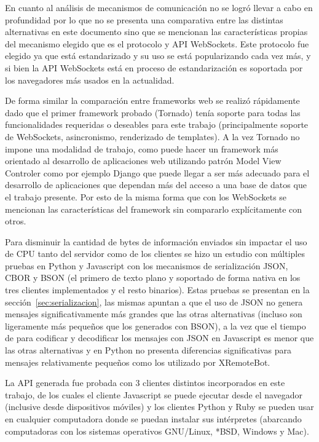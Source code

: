 En cuanto al análisis de mecanismos de comunicación no se logró llevar a cabo
en profundidad por lo que no se presenta una comparativa entre las distintas
alternativas en este documento sino que se mencionan las características propias
del mecanismo elegido que es el protocolo y API WebSockets. Este protocolo fue
elegido ya que está estandarizado y su uso se está popularizando cada vez más,
y si bien la API WebSockets está en proceso de estandarización es soportada
por los navegadores más usados en la actualidad.

De forma similar la comparación entre frameworks web se realizó rápidamente
dado que el primer framework probado (Tornado) tenía soporte para todas
las funcionalidades requeridas o deseables para este trabajo (principalmente
soporte de WebSockets, asincronismo, renderizado de templates).
A la vez Tornado no impone
una modalidad de trabajo, como puede hacer un framework más orientado al
desarrollo de aplicaciones web utilizando patrón Model View Controler
como por ejemplo Django que puede llegar a ser más adecuado para el desarrollo
de aplicaciones que dependan más del acceso a una base de datos que el
trabajo presente. Por esto de la misma forma que con los WebSockets se mencionan
las características del framework sin compararlo explícitamente con otros.

Para disminuir la cantidad de bytes de información enviados sin impactar el
uso de CPU tanto del servidor como de los clientes se hizo un estudio con
múltiples pruebas en Python y Javascript con los mecanismos de serialización
JSON, CBOR y BSON (el primero de texto plano y soportado de forma nativa en los
tres clientes implementados y el resto binarios). Estas pruebas se presentan
en la sección~\ref{sec:serializacion}, las mismas apuntan a que el uso de JSON
no genera mensajes significativamente más grandes que las otras alternativas
(incluso son ligeramente más pequeños que los generados con BSON), a la vez
que el tiempo de para codificar y decodificar los mensajes con JSON en
Javascript es menor que las otras alternativas y en Python no presenta
diferencias significativas para mensajes relativamente pequeños como los utilizado
por XRemoteBot.

La API generada fue probada con 3 clientes distintos incorporados en este
trabajo, de los cuales el cliente Javascript se puede ejecutar desde el
navegador (inclusive desde dispositivos móviles) y los clientes Python y
Ruby se pueden usar en cualquier computadora
donde se puedan instalar sus intérpretes (abarcando computadoras con
los sistemas operativos GNU/Linux, *BSD, Windows y Mac).

